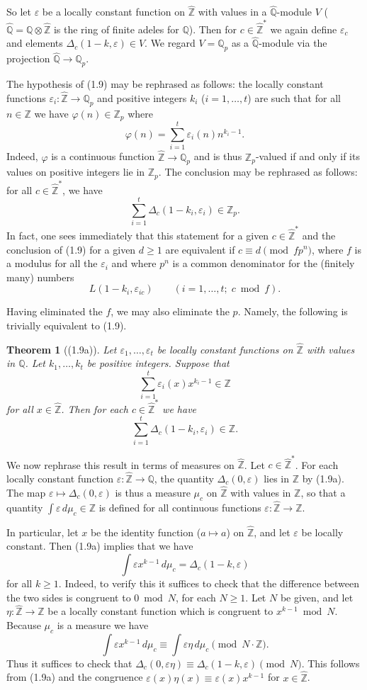 \documentclass[12pt,a4paper]{article}
\theoremstyle{plain}
\newtheorem{theorem}{Theorem}[section]
\theoremstyle{definition}
\newcommand{\Z}{\mathbb{Z}}
\newcommand{\Q}{\mathbb{Q}}
\begin{document}
So let $\varepsilon$ be a locally constant function on $\hat{\Z}$ with values in a $\hat{\Q}$-module $V$ ($\hat{\Q}=\Q\otimes\hat{\Z}$ is the ring of finite adeles for $\Q$). Then for $c\in\hat{\Z}^*$ we again define $\varepsilon_c$ and elements $\Delta_c(1-k,\varepsilon)\in V$. We regard $V=\Q_p$ as a $\hat{\Q}$-module via the projection $\hat{\Q}\to\Q_p$.

The hypothesis of (1.9) may be rephrased as follows: the locally constant functions $\varepsilon_i:\hat{\Z}\to\Q_p$ and positive integers $k_i$ ($i=1,\dots,t$) are such that for all $n\in\Z$ we have $\varphi(n)\in\Z_p$ where
\[
\varphi(n)=\sum_{i=1}^{t}\varepsilon_i(n)n^{k_i-1}.
\]
Indeed, $\varphi$ is a continuous function $\hat{\Z}\to\Q_p$ and is thus $\Z_p$-valued if and only if its values on positive integers lie in $\Z_p$. The conclusion may be rephrased as follows: for all $c\in\hat{\Z}^*$, we have
\[
\sum_{i=1}^{t}\Delta_c(1-k_i,\varepsilon_i)\in\Z_p.
\]
In fact, one sees immediately that this statement for a given $c\in\hat{\Z}^*$ and the conclusion of (1.9) for a given $d\ge1$ are equivalent if $c\equiv d\pmod{fp^n}$, where $f$ is a modulus for all the $\varepsilon_i$ and where $p^n$ is a common denominator for the (finitely many) numbers
\[
L(1-k_i,\varepsilon_{ic})\qquad(i=1,\dots,t;\;c\bmod f).
\]

Having eliminated the $f$, we may also eliminate the $p$. Namely, the following is trivially equivalent to (1.9).

\begin{theorem}[(1.9a)]\label{thm:kummer-a}
Let $\varepsilon_1,\dots,\varepsilon_t$ be locally constant functions on $\hat{\Z}$ with values in $\Q$. Let $k_1,\dots,k_t$ be positive integers. Suppose that
\[
\sum_{i=1}^{t}\varepsilon_i(x)x^{k_i-1}\in\Z
\]
for all $x\in\hat{\Z}$. Then for each $c\in\hat{\Z}^*$ we have
\[
\sum_{i=1}^{t}\Delta_c(1-k_i,\varepsilon_i)\in\Z.
\]
\end{theorem}

We now rephrase this result in terms of measures on $\hat{\Z}$. Let $c\in\hat{\Z}^*$. For each locally constant function $\varepsilon:\hat{\Z}\to\Q$, the quantity $\Delta_c(0,\varepsilon)$ lies in $\Z$ by (1.9a). The map $\varepsilon\mapsto\Delta_c(0,\varepsilon)$ is thus a measure $\mu_c$ on $\hat{\Z}$ with values in $\Z$, so that a quantity $\int\varepsilon\,d\mu_c\in\Z$ is defined for all continuous functions $\varepsilon:\hat{\Z}\to\Z$.

In particular, let $x$ be the identity function ($a\mapsto a$) on $\hat{\Z}$, and let $\varepsilon$ be locally constant. Then (1.9a) implies that we have
\[
\int\varepsilon x^{k-1}\,d\mu_c=\Delta_c(1-k,\varepsilon)
\]
for all $k\ge1$. Indeed, to verify this it suffices to check that the difference between the two sides is congruent to $0\bmod N$, for each $N\ge1$. Let $N$ be given, and let $\eta:\hat{\Z}\to\Z$ be a locally constant function which is congruent to $x^{k-1}\bmod N$. Because $\mu_c$ is a measure we have
\[
\int\varepsilon x^{k-1}\,d\mu_c\equiv\int\varepsilon\eta\,d\mu_c\pmod{N\cdot\Z}.
\]
Thus it suffices to check that $\Delta_c(0,\varepsilon\eta)\equiv\Delta_c(1-k,\varepsilon)\pmod{N}$. This follows from (1.9a) and the congruence $\varepsilon(x)\eta(x)\equiv\varepsilon(x)x^{k-1}$ for $x\in\hat{\Z}$.
\end{document}
